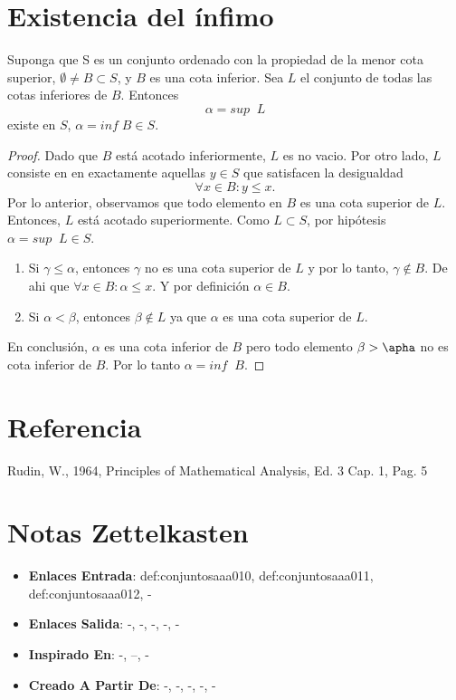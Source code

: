 \documentclass[12pt]{article}
\begin{document}
\section*{Existencia del ínfimo}

\begin{theorem}
Suponga que S es un conjunto ordenado con la propiedad de la menor cota superior, $\emptyset \neq B \subset S$, y $B$ es una cota inferior. 
Sea $L$ el conjunto de todas las cotas inferiores de $B$. Entonces
\[ \alpha = sup\;\; L\]
existe en $S$, $\alpha = inf\;B \in S.$ 
\end{theorem}

\begin{proof}
Dado que $B$ está acotado inferiormente, $L$ es no vacio. Por otro lado, $L$ consiste en en exactamente aquellas $y \in S$ que satisfacen la desigualdad
\[\forall x \in B: y \leq x.\]
Por lo anterior, observamos que  todo elemento en $B$ es una cota superior de $L$. Entonces, $L$ está acotado superiormente. Como $L \subset S$, por
hipótesis $\alpha = sup \;\; L \in S$. 
\begin{enumerate}
\item Si $\gamma \leq \alpha$, entonces $\gamma$ no es una cota superior de $L$ y por lo tanto, $\gamma \notin B$. De ahi que $\forall x \in B: \alpha \leq x$.
Y por definición $\alpha \in B.$
\item Si $\alpha < \beta$, entonces $\beta \notin L$ ya que $\alpha$  es una cota superior de $L$.
\end{enumerate}
En conclusión, $\alpha$ es una cota inferior de $B$ pero todo elemento $\beta > \apha$ no es  cota inferior de $B$. Por lo tanto $\alpha = inf\;\;B$.
\end{proof}

\section*{Referencia}
Rudin, W., 1964, Principles of Mathematical Analysis, Ed. 3 Cap. 1, Pag. 5 

\section*{Notas Zettelkasten}
\begin{itemize}
  \item \textbf{Enlaces Entrada}: def:conjuntosaaa010, def:conjuntosaaa011, def:conjuntosaaa012, -
  \item \textbf{Enlaces Salida}: -, -, -, -, -
  \item \textbf{Inspirado En}: -, --, -
  \item \textbf{Creado A Partir De}: -, -, -, -, -
\end{itemize}
\end{document}
